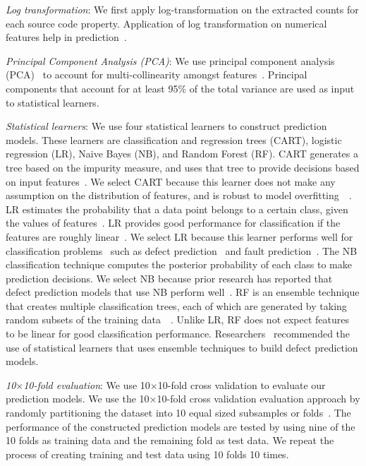 \documentclass[smallextended]{svjour3}       %
\begin{document}
\textit{Log transformation}: We first apply log-transformation on the extracted counts for each source code property. Application of log transformation on numerical features help in prediction~\citep{Menzies:TSE2007}.

\textit{Principal Component Analysis (PCA)}: We use principal component analysis (PCA)~\citep{Tan:2005:IDM} to account for multi-collinearity amongst features~\citep{Tan:2005:IDM}. Principal components that account for at least 95\% of the total variance are used as input to statistical learners. 

\textit{Statistical learners}: We use four statistical learners to construct prediction models. These learners are classification and regression trees (CART), logistic regression (LR), Naive Bayes (NB), and Random Forest (RF). CART generates a tree based on the impurity measure, and uses that tree to provide decisions based on input features~\citep{cart:original}. We select CART because this learner does not make any assumption on the distribution of features, and is robust to model overfitting~\citep{Tan:2005:IDM}~\citep{cart:original}. LR estimates the probability that a data point belongs to a certain class, given the values of features~\citep{logit:original}. LR provides good performance for classification if the features are roughly linear~\citep{logit:original}. We select LR because this learner performs well for classification problems~\citep{logit:original} such as defect prediction~\citep{Rahman:2013:ProcessBetter} and fault prediction~\citep{tracy:tse:lrisgood:2012}. The NB classification technique computes the posterior probability of each class to make prediction decisions. We select NB because prior research has reported that defect prediction models that use NB perform well~\citep{tracy:tse:lrisgood:2012}. RF is an ensemble technique that creates multiple classification trees, each of which are generated by taking random subsets of the training data~\citep{Breiman2001:RF:ORIGINAL}~\citep{Tan:2005:IDM}. Unlike LR, RF does not expect features to be linear for good classification performance. Researchers~\citep{Ghotra:ICSE2015} recommended the use of statistical learners that uses ensemble techniques to build defect prediction models. 

\textit{10$\times$10-fold evaluation}: We use 10$\times$10-fold cross validation to evaluate our prediction models. We use the 10$\times$10-fold cross validation evaluation approach by randomly partitioning the dataset into 10 equal sized subsamples or folds~\citep{Tan:2005:IDM}. The performance of the constructed prediction models are tested by using nine of the 10 folds as training data and the remaining fold as test data. We repeat the process of creating training and test data using 10 folds 10 times. 
\end{document}
